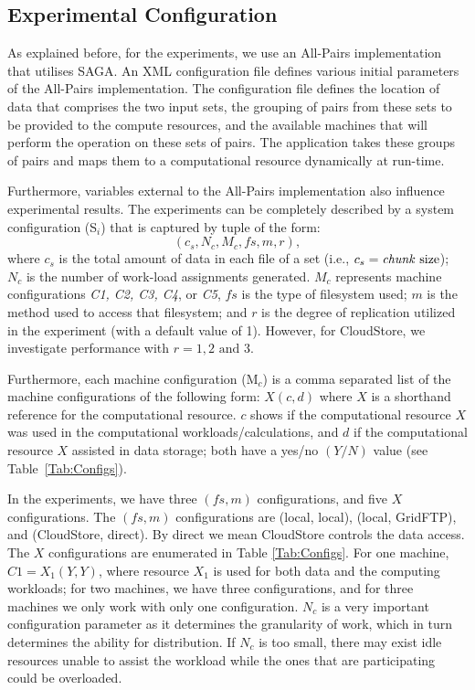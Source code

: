 \documentclass{rspublic}
\begin{document}
\vspace{-0.4cm}

\subsection{Experimental Configuration}

\vspace{-0.1cm}

As explained before, for the experiments, we use an All-Pairs
implementation that utilises SAGA. An XML configuration file defines
various initial parameters of the All-Pairs
implementation. The configuration file defines the location of data that
comprises the two input sets, the grouping of pairs from these sets to
be provided to the compute resources, and the available machines that
will perform the operation on these sets of pairs. The application takes
these groups of pairs and maps them to a computational resource
dynamically at run-time.

Furthermore, variables external to the All-Pairs implementation also
influence experimental results. The experiments can be completely
described by a system configuration (S$_i$) that is captured by tuple
of the form:
\vspace{-0.2cm}
\begin{equation}
(c_s, N_c, M_c, f\!s, m,r),
\label{Eq:tuple}
\end{equation}
where $c_s$ is the total amount of data in each file of a set (i.e.,
$c_s=\mbox{\textit{chunk} size}$); $N_c$ is the number of work-load
assignments generated. $M_c$ represents machine configurations
\textit{C1, C2, C3, C4}, or \textit{C5}, $f\!s$ is the type of
filesystem used; $m$ is the method used to access that filesystem; and
$r$ is the degree of replication utilized in the experiment (with a
default value of 1). However, for CloudStore, we investigate
performance with $r = 1, 2 \mbox{ and } 3$.

Furthermore, each machine configuration (M$_c$) is a comma separated
list of the machine configurations of the following form: $X(c, d)$
where $X$ is a shorthand reference for the computational resource. $c$
shows if the computational resource $X$ was used in the computational
workloads/calculations, and $d$ if the computational resource $X$
assisted in data storage; both have a yes/no $(Y/N)$ value (see
Table~\ref{Tab:Configs}).

In the experiments, we have three $(f\!s, m)$ configurations, and five
$X$ configurations. The $(f\!s, m)$ configurations are (local, local),
(local, GridFTP), and (CloudStore, direct). By direct we mean
CloudStore controls the data access. The $X$ configurations are
enumerated in Table \ref{Tab:Configs}. For one machine,
$\textit{C1}=X_1(Y,Y)$, where resource $X_1$ is used for both data and
the computing workloads; for two machines, we have three
configurations, and for three machines we only work with only one
configuration. $N_c$ is a very important configuration parameter as it
determines the granularity of work, which in turn determines the
ability for distribution. If $N_c$ is too small, there may exist idle
resources unable to assist the workload while the ones that are
participating could be overloaded.
\end{document}
